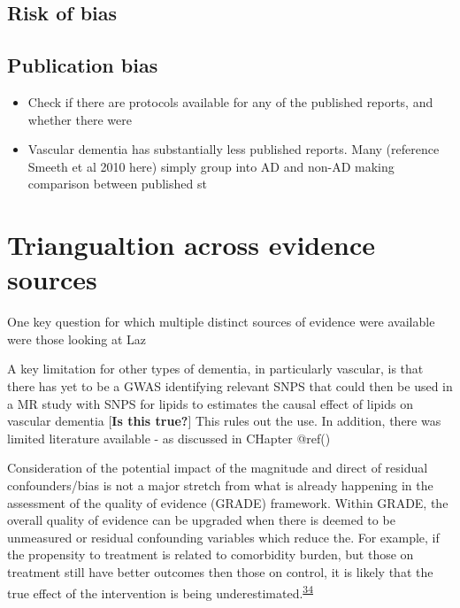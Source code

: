\documentclass[a4paper, twoside]{templates/ociamthesis}
\providecommand{\tightlist}{%
  \setlength{\itemsep}{0pt}\setlength{\parskip}{0pt}}
\begin{document}
\hypertarget{risk-of-bias-subheading}{%
\subsection{Risk of bias}\label{risk-of-bias-subheading}}

\hypertarget{publication-bias}{%
\subsection{Publication bias}\label{publication-bias}}

\begin{itemize}
\tightlist
\item
  Check if there are protocols available for any of the published reports, and whether there were
\item
  Vascular dementia has substantially less published reports. Many (reference Smeeth et al 2010 here) simply group into AD and non-AD making comparison between published st
\end{itemize}

\hypertarget{triangualtion-across-evidence-sources}{%
\section{Triangualtion across evidence sources}\label{triangualtion-across-evidence-sources}}

One key question for which multiple distinct sources of evidence were available were those looking at Laz

A key limitation for other types of dementia, in particularly vascular, is that there has yet to be a GWAS identifying relevant SNPS that could then be used in a MR study with SNPS for lipids to estimates the causal effect of lipids on vascular dementia {[}\textbf{Is this true?}{]} This rules out the use. In addition, there was limited literature available - as discussed in CHapter @ref()

Consideration of the potential impact of the magnitude and direct of residual confounders/bias is not a major stretch from what is already happening in the assessment of the quality of evidence (GRADE) framework. Within GRADE, the overall quality of evidence can be upgraded when there is deemed to be unmeasured or residual confounding variables which reduce the. For example, if the propensity to treatment is related to comorbidity burden, but those on treatment still have better outcomes then those on control, it is likely that the true effect of the intervention is being underestimated.\textsuperscript{\protect\hyperlink{ref-guyatt2011}{34}}
\end{document}
